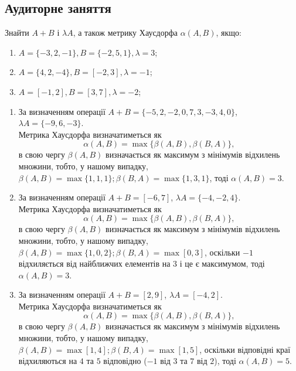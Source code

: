 \newpage

\subsection{Аудиторне заняття}

\begin{problem}
	Знайти $A + B$ і $\lambda A$, а також метрику Хаусдорфа $\alpha (A, B)$, якщо:
	
	\begin{enumerate}
	    \item $A = \{-3, 2, -1\},  B = \{-2, 5, 1\},  \lambda = 3$;
	    
	    \item $A = \{4, 2, -4\},  B = [-2, 3],  \lambda = -1$;
	    
	    \item $A = [-1, 2],  B = [3, 7],  \lambda = -2$;
	    
	\end{enumerate}
	
\end{problem}

\begin{solution}

	\begin{enumerate}
	    \item За визначенням операції $A + B = \{-5, 2, -2, 0, 7, 3, -3, 4, 0\}$, $\lambda A = \{-9, 6, -3 \}$. \\
	    
	    Метрика Хаусдорфа визначатиметься як \[\alpha (A, B) = \max\{\beta (A, B), \beta (B, A)\},\] в свою чергу $\beta (A, B)$ визначається як максимум з мінімумів відхилень множини, тобто, у нашому випадку, $\beta (A, B) = \max\{1, 1, 1\}; \beta (B, A) = \max\{1, 3, 1\}$, тоді $\alpha (A, B) = 3$.
	    
	    \item За визначенням операції $A + B = [-6,7]$, $\lambda A = \{-4, -2, 4 \}$.\\
	    
	    Метрика Хаусдорфа визначатиметься як \[\alpha (A, B) = \max\{\beta (A, B), \beta (B, A)\},\] в свою чергу $\beta (A, B)$ визначається як максимум з мінімумів відхилень множини, тобто, у нашому випадку, $\beta (A, B) = \max\{1, 0, 2\}; \beta (B, A) = \max[0, 3]$, оскільки $-1$ відхиляється від найближчих елементів на $3$ і це є максимумом, тоді $\alpha (A, B) = 3$.
	    
	    \item За визначенням операції $A + B = [2,9]$, $\lambda A = [-4,2]$. \\
	    
	    Метрика Хаусдорфа визначатиметься як \[\alpha (A, B) = \max\{\beta (A, B), \beta (B, A)\},\] в свою чергу $\beta (A, B)$ визначається як максимум з мінімумів відхилень множини, тобто, у нашому випадку, $\beta (A, B) = \max[1,4]; \beta (B, A) = \max[1, 5]$, оскільки відповідні краї відхиляються на $4$ та $5$ відповідно ($-1$ від $3$ та $7$ від $2$), тоді $\alpha (A, B) = 5$.
	    
	\end{enumerate}
	
\end{solution}


